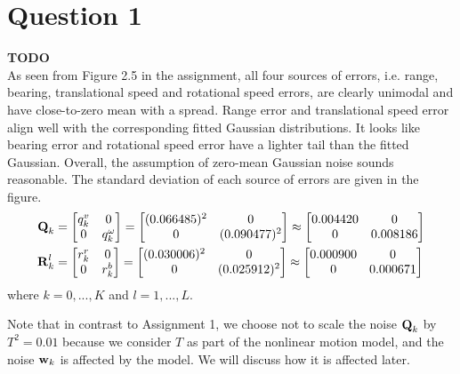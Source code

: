 \documentclass[a4paper]{article}
\begin{document}
\section*{Question 1} 
\textbf{TODO}\\
As seen from Figure 2.5 in the assignment, all four sources of errors, i.e. range, bearing, translational speed and rotational speed errors, are clearly unimodal and have close-to-zero mean with a spread. Range error and translational speed error align well with the corresponding fitted Gaussian distributions. It looks like bearing error and rotational speed error have a lighter tail than the fitted Gaussian. Overall, the assumption of zero-mean Gaussian noise sounds reasonable. The standard deviation of each source of errors are given in the figure.
\begin{eqnarray*}
    \bm{\mathbf{Q}}_k & = \begin{bmatrix} q^v_k & 0 \\ 0 & q^\omega_k \end{bmatrix} 
                = \begin{bmatrix}
                (0.066485)^2  & 0\\
                0 & (0.090477)^2 
              \end{bmatrix} \approx
              \begin{bmatrix}
                0.004420  & 0\\
                0 & 0.008186
              \end{bmatrix}
              \\
    \bm{\mathbf{R}}_k^l & = \begin{bmatrix} r^r_k & 0 \\ 0 & r^b_k \end{bmatrix} 
                = \begin{bmatrix}
                (0.030006)^2  & 0\\
                0 & (0.025912)^2
              \end{bmatrix} \approx
              \begin{bmatrix}
                0.000900 & 0\\
                0 & 0.000671 
              \end{bmatrix}
\end{eqnarray*}
where $k = 0, ..., K$ and $l = 1, ..., L$.

Note that in contrast to Assignment 1, we choose not to scale the noise $\bm{\mathbf{Q}}_k$ by $T^2=0.01$ because we consider $T$ as part of the nonlinear motion model, and the noise $\bm{\mathbf{w}}_k$ is affected by the model. We will discuss how it is affected later.
\end{document}
